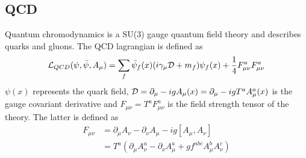 \subsection{QCD}
	Quantum chromodynamics is a SU(3) gauge quantum field theory and describes quarks and gluons. The QCD lagrangian is defined as \cite{qcd1_script_philipsen}
	\begin{equation}
	    \mathcal{L}_{QCD}(\psi,\bar{\psi},A_\mu) = \sum_f \bar{\psi}_f(x)(i\gamma_\mu\mathcal{D} + m_f)\psi_f(x) + \frac{1}{4}F^a_{\mu\nu}F^a_{\mu\nu}
	    \label{qcd_lagrangian}
	\end{equation}
	$\psi(x)$ represents the quark field, $\mathcal{D} = \partial_\mu - igA_\mu(x) = \partial_\mu-igT^aA^a_\mu(x)$ is the gauge covariant derivative and $F_{\mu\nu} = T^aF^a_{\mu\nu}$ is the field strength tensor of the theory. The latter is defined as
	\begin{equation}\label{strenth_tensor}
	\begin{aligned}
	    F_{\mu\nu} &= \partial_\mu A_\nu - \partial_\nu A_\mu-ig[A_\mu,A_\nu]\\
	    &= T^a(\partial_\mu A^a_\nu - \partial_\nu A^a_\mu + g f^{abc}A^b_\mu A^c_\nu)
	\end{aligned}
	\end{equation}
	
